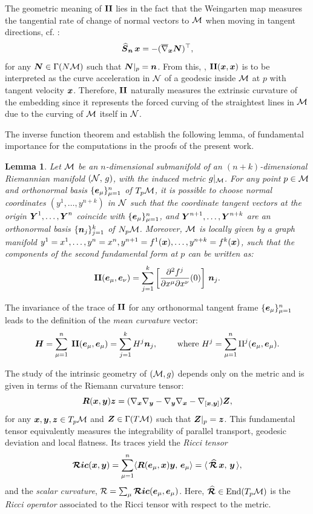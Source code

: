 \documentclass[letterpaper, reqno, 11pt]{amsart}
\newtheorem{lemma}[theorem]{Lemma}
\theoremstyle{definition}
\theoremstyle{remark}
\numberwithin{equation}{section}
\begin{document}
The geometric meaning of $\boldsymbol{\mathrm{II}}$ lies in the fact that the Weingarten map measures the tangential rate of change of normal vectors to ${\mathcal M}$ when moving in tangent directions, cf. \cite[Eq. II.2.4]{chavel2006}:
$$
	\boldsymbol{\widehat{S}}_{\boldsymbol{n}}\,\boldsymbol{x} = - (\overline{\nabla}_{\boldsymbol{x}}\boldsymbol{N})^\top,
$$
for any $\boldsymbol{N}\in\Gamma(N{\mathcal M})$ such that $\boldsymbol{N}\vert_p=\boldsymbol{n}$. From this, \cite[Ch. 4, Cor. 9, 10]{oneil1983}, $\boldsymbol{\mathrm{II}}(\boldsymbol{x},\boldsymbol{x})$ is to be interpreted as the curve acceleration in $\mathcal{N}$ of a geodesic inside ${\mathcal M}$ at $p$ with tangent velocity $\boldsymbol{x}$. Therefore, $\boldsymbol{\mathrm{II}}$ naturally measures the extrinsic curvature of the embedding since it represents the forced curving of the straightest lines in ${\mathcal M}$ due to the curving of ${\mathcal M}$ itself in $\mathcal{N}$.

The inverse function theorem and \cite[Ch. VII, Ex. 3.3]{kobayashi1969} establish the following lemma, of fundamental importance for the computations in the proofs of the present work.

\begin{lemma}
Let ${\mathcal M}$ be an $n$-dimensional submanifold of an $(n+k)$-dimensional Riemannian manifold $(\mathcal{N},\, g)$, with the induced metric $g\vert_{{\mathcal M}}$. For any point $p\in{\mathcal M}$ and orthonormal basis $\{\boldsymbol{e}_\mu\}_{\mu=1}^n$ of $T_p{\mathcal M}$, it is possible to choose normal coordinates $(y^1,\dots,y^{n+k})$ in $\mathcal{N}$ such that the coordinate tangent vectors at the origin $\boldsymbol{Y}^1,\dots,\boldsymbol{Y}^n$ coincide with $\{\boldsymbol{e}_\mu\}_{\mu=1}^n$, and $\boldsymbol{Y}^{n+1},\dots,\boldsymbol{Y}^{n+k}$ are an orthonormal basis $\{\boldsymbol{n}_j\}_{j=1}^k$ of $N_p{\mathcal M}$. Moreover, ${\mathcal M}$ is locally given by a graph manifold $y^1=x^1,\dots, y^n=x^n,y^{n+1}=f^1(\boldsymbol{x}),\dots, y^{n+k}=f^k(\boldsymbol{x})$, such that the components of the second fundamental form at $p$ can be written as:
\begin{equation}\label{eq:IIlocal}
	\boldsymbol{\mathrm{II}}(\boldsymbol{e}_\mu,\boldsymbol{e}_\nu) =\sum_{j=1}^k \left[ \frac{\partial^2 f^j}{\partial x^\mu\partial x^\nu}(0) \right]\,\boldsymbol{n}_j .
\end{equation}
\end{lemma}

The invariance of the trace of $\boldsymbol{\mathrm{II}}$ for any orthonormal tangent frame $\{\boldsymbol{e}_\mu\}_{\mu=1}^n$ leads to the definition of the \emph{mean curvature} vector:
\begin{equation}
\boldsymbol{H} = \sum_{\mu=1}^n\;\boldsymbol{\mathrm{II}}(\boldsymbol{e}_\mu,\boldsymbol{e}_\mu) = \sum_{j=1}^k H^j\boldsymbol{n}_j, \qquad\text{ where } H^j=\sum_{\mu=1}^n\mathrm{II}^j(\boldsymbol{e}_\mu,\boldsymbol{e}_\mu).
\end{equation}

The study of the intrinsic geometry of $({\mathcal M},g)$ depends only on the metric and is given in terms of the Riemann curvature tensor:
$$
\boldsymbol{R}(\boldsymbol{x},\boldsymbol{y})\boldsymbol{z}=(\nabla_{\boldsymbol{x}}\nabla_{\boldsymbol{y}}-\nabla_{\boldsymbol{y}}\nabla_{\boldsymbol{x}}-\nabla_{[\boldsymbol{x},\boldsymbol{y}]})\boldsymbol{Z},
$$
for any $\boldsymbol{x},\boldsymbol{y},\boldsymbol{z}\in T_p{\mathcal M}$ and $\boldsymbol{Z}\in\Gamma(T{\mathcal M})$ such that $\boldsymbol{Z}\vert_p=\boldsymbol{z}$. This fundamental tensor equivalently measures the integrability of parallel transport, geodesic deviation and local flatness. Its traces yield the \emph{Ricci tensor} 
$$
\boldsymbol{\mathcal{R}ic}({\boldsymbol{x}},{\boldsymbol{y}})=\sum_{\mu=1}^n\langle\boldsymbol{R}({\boldsymbol{e}_\mu},{\boldsymbol{x}}){\boldsymbol{y}},\,{\boldsymbol{e}_\mu}\rangle = \langle\, {\boldsymbol{\widehat{\mathcal{R}}}\,\boldsymbol{x}},\,{\boldsymbol{y}}\,\rangle,
$$
and the \emph{scalar curvature}, $\mathcal{R} = \sum_{\mu}\boldsymbol{\mathcal{R}ic}({\boldsymbol{e}_\mu},{\boldsymbol{e}_\mu})$. Here, $\boldsymbol{\widehat{\mathcal{R}}}\in\text{End}(T_p{\mathcal M})$ is the \emph{Ricci operator} associated to the Ricci tensor with respect to the metric.
\end{document}
